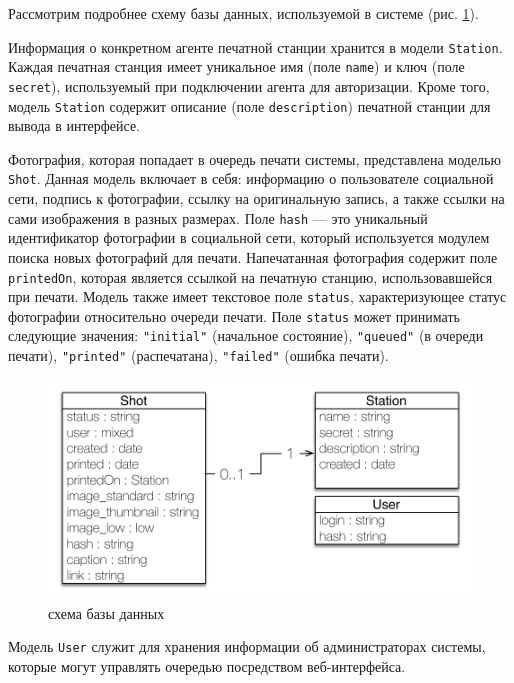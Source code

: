 \documentclass[a4paper,14pt,href]{article}
\begin{document}
Рассмотрим подробнее схему базы данных, используемой в системе (рис. \ref{fig:DataModel}).

Информация о конкретном агенте печатной станции хранится в модели \texttt{Station}. Каждая печатная станция имеет
уникальное имя (поле \texttt{name}) и ключ (поле \texttt{secret}), используемый при подключении агента для авторизации.
Кроме того, модель \texttt{Station} содержит описание (поле \texttt{description}) печатной станции для вывода в интерфейсе.

Фотография, которая попадает в очередь печати системы, представлена моделью \texttt{Shot}. Данная модель включает в себя:
информацию о пользователе социальной сети, подпись к фотографии, ссылку на оригинальную запись, а также ссылки на сами
изображения в разных размерах. Поле \texttt{hash} --- это уникальный идентификатор фотографии в социальной сети, который
используется модулем поиска новых фотографий для печати. Напечатанная фотография содержит поле \texttt{printedOn}, которая
является ссылкой на печатную станцию, использовавшейся при печати. Модель также имеет текстовое поле \texttt{status},
характеризующее статус фотографии относительно очереди печати. Поле \texttt{status} может принимать следующие значения:
\texttt{"initial"} (начальное состояние), \texttt{"queued"} (в очереди печати), \texttt{"printed"} (распечатана), \texttt{"failed"}
(ошибка печати).

\begin{figure}[htbp]
\begin{center}
  \includegraphics[scale=0.8]{data-model-uml.pdf}
    \caption{схема базы данных}
    \label{fig:DataModel}
\end{center}
\end{figure}

Модель \texttt{User} служит для хранения информации об администраторах системы, которые могут управлять очередью посредством
веб-интерфейса.
\end{document}
